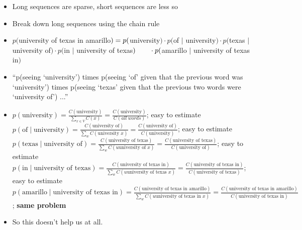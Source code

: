 \documentclass[11pt,letterpaper]{article}
\begin{document}
\begin{itemize}
  \item Long sequences are sparse, short sequences are less so
  \item Break down long sequences using the chain rule
  \item $p($university of texas in amarillo$) = \vspace{1mm} \\
         p($university$) \cdot 
         p($of $\mid$ university$) \cdot 
         p($texas $\mid$ university of$) \cdot 
         p($in $\mid$ university of texas$) \vspace{1mm} \\
  ~~~~~~ \cdot p($amarillo $\mid$ university of texas in$)$
  \item ``p(seeing `university') times p(seeing `of' given that the previous word was `university') times p(seeing `texas' given that the previous two words were `university of') ...''
  \item 
     $p(\text{university}) = 
     \frac{C(\text{university})}{\sum_{x \in V} C(x)} = 
     \frac{C(\text{university})}{C(all~words)}$; easy to estimate \vspace{1mm}
  \\ $p(\text{of} \mid \text{university}) = 
     \frac{C(\text{university of})}{\sum_w C(\text{university } x)} = 
     \frac{C(\text{university of})}{C(\text{university})}$; easy to estimate \vspace{1mm}
  \\ $p(\text{texas} \mid \text{university of}) = 
     \frac{C(\text{university of texas})}{\sum_w C(u\text{university of } x)} = 
     \frac{C(\text{university of texas})}{C(\text{university of})}$; easy to estimate \vspace{1mm}
  \\ $p(\text{in} \mid \text{university of texas}) = 
     \frac{C(\text{university of texas in})}{\sum_w C(u\text{university of texas } x)} = 
     \frac{C(\text{university of texas in})}{C(\text{university of texas})}$; easy to estimate \vspace{1mm}
  \\ $p(\text{amarillo} \mid \text{university of texas in}) = 
     \frac{C(\text{university of texas in amarillo})}{\sum_w C(u\text{university of texas in } x)} = 
     \frac{C(\text{university of texas in amarillo})}{C(\text{university of texas in})}$; \textbf{same problem}
  \item So this doesn't help us at all.
\end{itemize}
\end{document}
